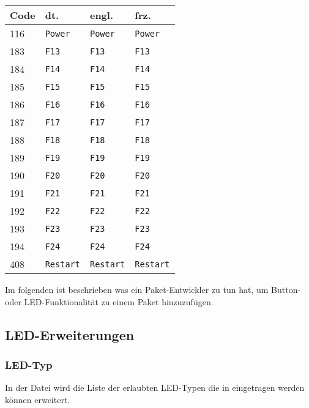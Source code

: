 \begin{longtable}{|l|l|l|l|}
  \hline
  \textbf{Code} & \textbf{dt.} & \textbf{engl.} & \textbf{frz.} \\
  \endhead
  \hline
  116 & \texttt{Power} & \texttt{Power} & \texttt{Power} \\ \hline
  183 & \texttt{F13} & \texttt{F13} & \texttt{F13} \\ \hline
  184 & \texttt{F14} & \texttt{F14} & \texttt{F14} \\ \hline
  185 & \texttt{F15} & \texttt{F15} & \texttt{F15} \\ \hline
  186 & \texttt{F16} & \texttt{F16} & \texttt{F16} \\ \hline
  187 & \texttt{F17} & \texttt{F17} & \texttt{F17} \\ \hline
  188 & \texttt{F18} & \texttt{F18} & \texttt{F18} \\ \hline
  189 & \texttt{F19} & \texttt{F19} & \texttt{F19} \\ \hline
  190 & \texttt{F20} & \texttt{F20} & \texttt{F20} \\ \hline
  191 & \texttt{F21} & \texttt{F21} & \texttt{F21} \\ \hline
  192 & \texttt{F22} & \texttt{F22} & \texttt{F22} \\ \hline
  193 & \texttt{F23} & \texttt{F23} & \texttt{F23} \\ \hline
  194 & \texttt{F24} & \texttt{F24} & \texttt{F24} \\ \hline
  408 & \texttt{Restart} & \texttt{Restart} & \texttt{Restart} \\ \hline
\end{longtable}

  Im folgenden ist beschrieben was ein Paket-Entwickler zu tun hat, um Button- 
  oder LED-Funktionalität zu einem Paket hinzuzufügen\footnotemark.


\subsection{LED-Erweiterungen}
\subsubsection{LED-Typ}
  In der Datei  wird die Liste der erlaubten LED-Typen die
  in  eingetragen werden können erweitert.

